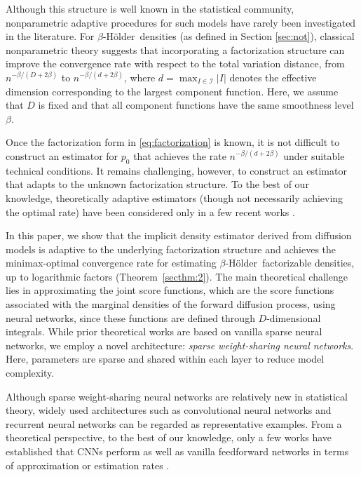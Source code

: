 \documentclass[twoside,11pt]{article}
\def\cI{\mathcal I}
\newcommand{\Holder}{H\"{o}lder}
\begin{document}
Although this structure is well known in the statistical community, nonparametric adaptive procedures for such models have rarely been investigated in the literature. For $\beta$-\Holder\ densities (as defined in Section \ref{sec:not}), classical nonparametric theory suggests that incorporating a factorization structure can improve the convergence rate with respect to the total variation distance, from $n^{-\beta/(D+2\beta)}$ \citep{tsybakov2008introduction, gine2016mathematical} to $n^{-\beta/(d+2\beta)}$, where $d = \max_{I\in\cI}|I|$ denotes the effective dimension corresponding to the largest component function. Here, we assume that $D$ is fixed and that all component functions have the same smoothness level $\beta$.

Once the factorization form in \eqref{eq:factorization} is known, it is not difficult to construct an estimator for $p_{0}$ that achieves the rate $n^{-\beta/(d+2\beta)}$ under suitable technical conditions.
It remains challenging, however, to construct an estimator that adapts to the unknown factorization structure.
To the best of our knowledge, theoretically adaptive estimators (though not necessarily achieving the optimal rate) have been considered only in a few recent works \citep{bos2024supervised, vandermeulen2024dimension, vandermeulen2024breaking}.

In this paper, we show that the implicit density estimator derived from diffusion models is adaptive to the underlying factorization structure and achieves the minimax-optimal convergence rate for estimating $\beta$-\Holder\ factorizable densities, up to logarithmic factors (Theorem~\ref{secthm:2}). The main theoretical challenge lies in approximating the joint score functions, which are the score functions associated with the marginal densities of the forward diffusion process, using neural networks, since these functions are defined through $D$-dimensional integrals. While prior theoretical works \citep{oko2023diffusion, tang2024adaptivity} are based on vanilla sparse neural networks, we employ a novel architecture: \emph{sparse weight-sharing neural networks}.
Here, parameters are sparse and shared within each layer to reduce model complexity.

Although sparse weight-sharing neural networks are relatively new in statistical theory, widely used architectures such as convolutional neural networks \citep[CNNs;][]{lecun1989handwritten, krizhevsky2012imagenet} and recurrent neural networks \citep{rumelhart1986learning, sutskever2014sequence} can be regarded as representative examples. From a theoretical perspective, to the best of our knowledge, only a few works have established that CNNs perform as well as vanilla feedforward networks in terms of approximation or estimation rates \citep{petersen2020equivalence, oono2019approximation, yang2024rates, fang2023optimal}.
\end{document}
